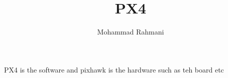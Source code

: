 \documentclass[a4paper]{article}
\title{PX4}
\date{}
\author{Mohammad Rahmani}
\begin{document}
   \maketitle
     PX4 is the software and pixhawk is the hardware such as teh board etc

   
   
\end{document}
